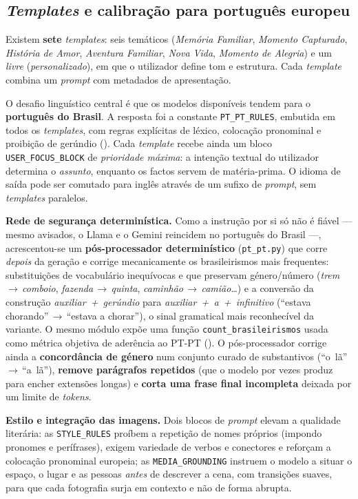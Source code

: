 \subsection{\emph{Templates} e calibração para português europeu}

Existem \textbf{sete} \emph{templates}: seis temáticos (\emph{Memória
Familiar}, \emph{Momento Capturado}, \emph{História de Amor},
\emph{Aventura Familiar}, \emph{Nova Vida}, \emph{Momento de Alegria}) e
um \emph{livre} (\emph{personalizado}), em que o utilizador define tom e
estrutura. Cada \emph{template} combina um \emph{prompt} com metadados de
apresentação.

O desafio linguístico central é que os modelos disponíveis tendem para o
\textbf{português do Brasil}. A resposta foi a constante
\texttt{PT\_PT\_RULES}, embutida em todos os \emph{templates}, com regras
explícitas de léxico, colocação pronominal e proibição de gerúndio
(). Cada \emph{template} recebe ainda um bloco
\texttt{USER\_FOCUS\_BLOCK} de \emph{prioridade máxima}: a intenção
textual do utilizador determina o \emph{assunto}, enquanto os factos
servem de matéria-prima. O idioma de saída pode ser comutado para inglês
através de um sufixo de \emph{prompt}, sem \emph{templates} paralelos.

\textbf{Rede de segurança determinística.} Como a instrução por si só não
é fiável --- mesmo avisados, o Llama e o Gemini reincidem no português do
Brasil ---, acrescentou-se um \textbf{pós-processador determinístico}
(\texttt{pt\_pt.py}) que corre \emph{depois} da geração e corrige
mecanicamente os brasileirismos mais frequentes: substituições de
vocabulário inequívocas e que preservam género/número (\emph{trem}\,$\rightarrow$\,\emph{comboio},
\emph{fazenda}\,$\rightarrow$\,\emph{quinta}, \emph{caminhão}\,$\rightarrow$\,\emph{camião}\ldots)
e a conversão da construção \emph{auxiliar~+~gerúndio} para
\emph{auxiliar~+~a~+~infinitivo} (``estava chorando''\,$\rightarrow$\,``estava a
chorar''), o sinal gramatical mais reconhecível da variante. O mesmo
módulo expõe uma função \texttt{count\_brasileirismos} usada como métrica
objetiva de aderência ao PT-PT (). O pós-processador
corrige ainda a \textbf{concordância de género} num conjunto curado de
substantivos (``o~lã''\,$\rightarrow$\,``a~lã''), \textbf{remove parágrafos
repetidos} (que o modelo por vezes produz para encher extensões longas) e
\textbf{corta uma frase final incompleta} deixada por um limite de
\emph{tokens}.

\textbf{Estilo e integração das imagens.} Dois blocos de \emph{prompt}
elevam a qualidade literária: as \texttt{STYLE\_RULES} proíbem a repetição
de nomes próprios (impondo pronomes e perífrases), exigem variedade de
verbos e conectores e reforçam a colocação pronominal europeia; as
\texttt{MEDIA\_GROUNDING} instruem o modelo a situar o espaço, o lugar e as
pessoas \emph{antes} de descrever a cena, com transições suaves, para que
cada fotografia surja em contexto e não de forma abrupta.

